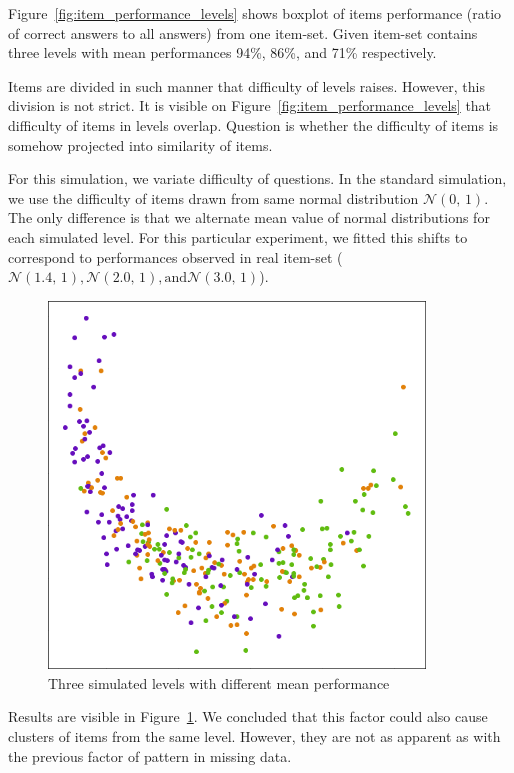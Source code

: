 \documentclass[
  printed, %
  table,   %
  nolof,     %
  nolot,     %
  color,
  final,
  nocover
]{fithesis3}
\begin{document}
Figure~\ref{fig:item_performance_levels} shows boxplot of items performance (ratio of correct answers to all answers) from one item-set. Given item-set contains three levels with mean performances 94\%, 86\%, and 71\% respectively.

Items are divided in such manner that difficulty of levels raises. However, this division is not strict. It is visible on Figure~\ref{fig:item_performance_levels} that difficulty of items in levels overlap. Question is whether the difficulty of items is somehow projected into similarity of items.

For this simulation, we variate difficulty of questions. In the standard simulation, we use the difficulty of items drawn from same normal distribution $\mathcal{N}(0,\,1)$. The only difference is that we alternate mean value of normal distributions for each simulated level. For this particular experiment, we fitted this shifts to correspond to performances observed in real item-set ($\mathcal{N}(1.4,\,1), \mathcal{N}(2.0,\,1), \text{and} \mathcal{N}(3.0,\,1)$).

\begin{figure}
  \includegraphics[width=10cm]{img/simulated_performance}
  \caption{Three simulated levels with different mean performance}
  \label{fig:simulated_performance}
\end{figure}


Results are visible in Figure~\ref{fig:simulated_performance}. We concluded that this factor could also cause clusters of items from the same level. However, they are not as apparent as with the previous factor of pattern in missing data.
\end{document}
